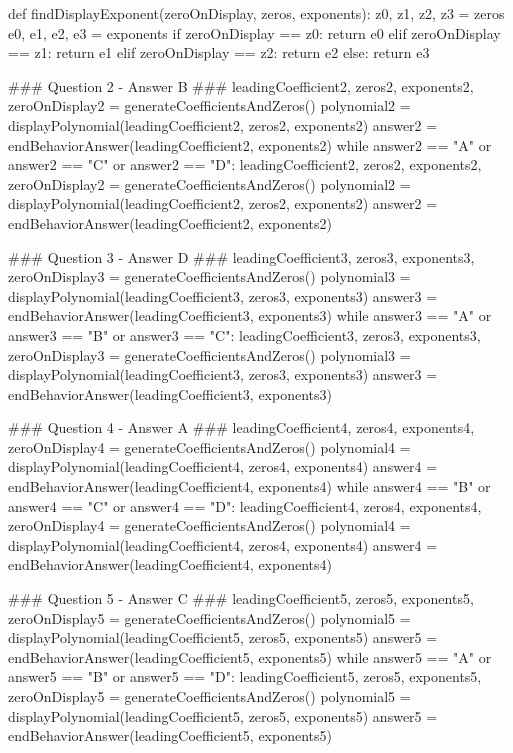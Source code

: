 \documentclass{ximera}
\begin{document}
\begin{sagesilent}
def findDisplayExponent(zeroOnDisplay, zeros, exponents):
    z0, z1, z2, z3 = zeros
    e0, e1, e2, e3 = exponents
    if zeroOnDisplay == z0:
        return e0
    elif zeroOnDisplay == z1: 
        return e1 
    elif zeroOnDisplay == z2:
        return e2
    else:
        return e3
    
### Question 2 - Answer B ###
leadingCoefficient2, zeros2, exponents2, zeroOnDisplay2 = generateCoefficientsAndZeros()
polynomial2 = displayPolynomial(leadingCoefficient2, zeros2, exponents2)
answer2 = endBehaviorAnswer(leadingCoefficient2, exponents2)
while answer2 == "A" or answer2 == "C" or answer2 == "D":
    leadingCoefficient2, zeros2, exponents2, zeroOnDisplay2 = generateCoefficientsAndZeros()
    polynomial2 = displayPolynomial(leadingCoefficient2, zeros2, exponents2)
    answer2 = endBehaviorAnswer(leadingCoefficient2, exponents2)

### Question 3 - Answer D ###
leadingCoefficient3, zeros3, exponents3, zeroOnDisplay3 = generateCoefficientsAndZeros()
polynomial3 = displayPolynomial(leadingCoefficient3, zeros3, exponents3)
answer3 = endBehaviorAnswer(leadingCoefficient3, exponents3)
while answer3 == "A" or answer3 == "B" or answer3 == "C":
    leadingCoefficient3, zeros3, exponents3, zeroOnDisplay3 = generateCoefficientsAndZeros()
    polynomial3 = displayPolynomial(leadingCoefficient3, zeros3, exponents3)
    answer3 = endBehaviorAnswer(leadingCoefficient3, exponents3)

### Question 4 - Answer A ###
leadingCoefficient4, zeros4, exponents4, zeroOnDisplay4 = generateCoefficientsAndZeros()
polynomial4 = displayPolynomial(leadingCoefficient4, zeros4, exponents4)
answer4 = endBehaviorAnswer(leadingCoefficient4, exponents4)
while answer4 == "B" or answer4 == "C" or answer4 == "D":
    leadingCoefficient4, zeros4, exponents4, zeroOnDisplay4 = generateCoefficientsAndZeros()
    polynomial4 = displayPolynomial(leadingCoefficient4, zeros4, exponents4)
    answer4 = endBehaviorAnswer(leadingCoefficient4, exponents4)

### Question 5 - Answer C ###
leadingCoefficient5, zeros5, exponents5, zeroOnDisplay5 = generateCoefficientsAndZeros()
polynomial5 = displayPolynomial(leadingCoefficient5, zeros5, exponents5)
answer5 = endBehaviorAnswer(leadingCoefficient5, exponents5)
while answer5 == "A" or answer5 == "B" or answer5 == "D":
    leadingCoefficient5, zeros5, exponents5, zeroOnDisplay5 = generateCoefficientsAndZeros()
    polynomial5 = displayPolynomial(leadingCoefficient5, zeros5, exponents5)
    answer5 = endBehaviorAnswer(leadingCoefficient5, exponents5)


\end{sagesilent}
\end{document}
